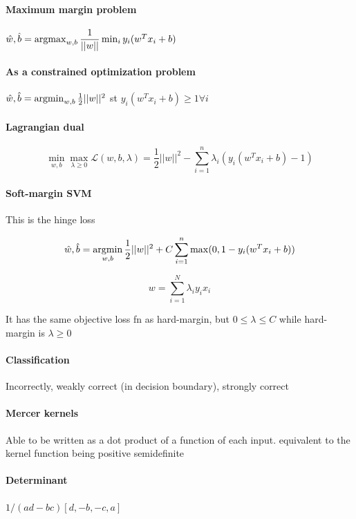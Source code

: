 \documentclass[11pt]{article}
\begin{document}
\paragraph{Maximum margin problem} $\hat{w}, \hat{b} = \operatorname*{arg max}_{w, b} \dfrac{1}{||w||} \min_{i} y_i (w^T x_i + b)$

\paragraph{As a constrained optimization problem} $\hat{w}, \hat{b} = \operatorname*{arg min}_{w, b} \frac{1}{2} ||w||^2$ st $y_i (w^T x_i + b) \geq 1 \forall i$

\paragraph{Lagrangian dual} 

$$\min_{w, b} \max_{\lambda \geq 0} \mathcal{L}(w, b, \lambda) = \frac{1}{2} ||w||^2 - \sum_{i=1}^n \lambda_i (y_i (w^T x_i + b) - 1)$$

\paragraph{Soft-margin SVM}

This is the hinge loss

$$\hat{w}, \hat{b} = \operatorname*{arg min}_{w, b} \frac{1}{2} ||w||^2 + C \sum_{i=1}^n \max(0, 1 - y_i (w^T x_i + b))$$

$$w = \sum_{i=1}^N \lambda_i y_i x_i$$ 

It has the same objective loss fn as hard-margin, but $0 \leq \lambda \leq C$ while hard-margin is $\lambda \geq 0$

\paragraph{Classification} Incorrectly, weakly correct (in decision boundary), strongly correct

\paragraph{Mercer kernels} Able to be written as a dot product of a function of each input. equivalent to the kernel function being positive semidefinite

\paragraph{Determinant} $1/(ad-bc) [d, -b, -c, a]$
\end{document}
